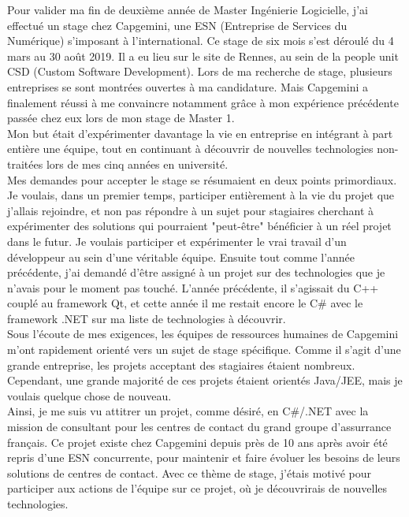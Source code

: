 \documentclass{rapport}
\begin{document}
Pour valider ma fin de deuxième année de Master Ingénierie Logicielle, j'ai effectué un stage chez Capgemini, une ESN (Entreprise de Services du Numérique) s'imposant à l'international. Ce stage de six mois s'est déroulé du 4 mars au 30 août 2019. Il a eu lieu sur le site de Rennes, au sein de la people unit CSD (Custom Software Development).
Lors de ma recherche de stage, plusieurs entreprises se sont montrées ouvertes à ma candidature. Mais Capgemini a finalement réussi à me convaincre notamment grâce à mon expérience précédente passée chez eux lors de mon stage de Master 1.
\\

Mon but était d'expérimenter davantage la vie en entreprise en intégrant à part entière une équipe, tout en continuant à découvrir de nouvelles technologies non-traitées lors de mes cinq années en université.
\\
Mes demandes pour accepter le stage se résumaient en deux points primordiaux.
Je voulais, dans un premier temps, participer entièrement à la vie du projet que j'allais rejoindre, et non pas répondre à un sujet pour stagiaires cherchant à expérimenter des solutions qui pourraient "peut-être" bénéficier à un réel projet dans le futur. Je voulais participer et expérimenter le vrai travail d'un développeur au sein d'une véritable équipe.
Ensuite tout comme l'année précédente, j'ai demandé d'être assigné à un projet sur des technologies que je n'avais pour le moment pas touché. L'année précédente, il s'agissait du C++ couplé au framework Qt, et cette année il me restait encore le C\# avec le framework .NET sur ma liste de technologies à découvrir.\\
Sous l'écoute de mes exigences, les équipes de ressources humaines de Capgemini m'ont rapidement orienté vers un sujet de stage spécifique. Comme il s'agit d'une grande entreprise, les projets acceptant des stagiaires étaient nombreux. Cependant, une grande majorité de ces projets étaient orientés Java/JEE, mais je voulais quelque chose de nouveau.\\

Ainsi, je me suis vu attitrer un projet, comme désiré, en C\#/.NET avec la mission de consultant pour les centres de contact du grand groupe d'assurrance français. Ce projet existe chez Capgemini depuis près de 10 ans après avoir été repris d'une ESN concurrente, pour maintenir et faire évoluer les besoins de leurs solutions de centres de contact. Avec ce thème de stage, j'étais motivé pour participer aux actions de l'équipe sur ce projet, où je découvrirais de nouvelles technologies.
\end{document}
